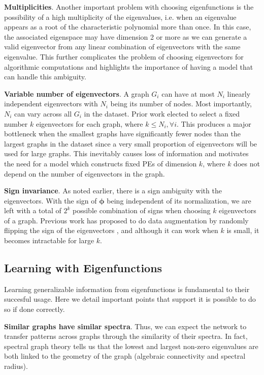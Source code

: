 \documentclass{article}
\newcommand{\xhdr}[1]{{\noindent\bfseries #1}.}
\def\eigvec{{\bm{\phi}}}
\begin{document}
\xhdr{Multiplicities}
Another important problem with choosing eigenfunctions is the possibility of a high multiplicity of the eigenvalues, i.e. when an eigenvalue appears as a root of the characteristic polynomial more than once. 
In this case, the associated eigenspace may have dimension 2 or more as we can generate a valid eigenvector from any linear combination of eigenvectors with the same eigenvalue. This further complicates the problem of choosing eigenvectors for algorithmic computations and highlights the importance of having a model that can handle this ambiguity.


\xhdr{Variable number of eigenvectors}
A graph $G_i$ can have at most $N_i$ linearly independent eigenvectors with $N_i$ being its number of nodes. Most importantly, $N_i$ can vary across all $G_i$ in the dataset. Prior work \cite{dwivedi2020generalization} elected to select a fixed number $k$ eigenvectors for each graph, where $k\leq N_i,  \forall i$. This produces a major bottleneck when the smallest graphs have significantly fewer nodes than the largest graphs in the dataset since a very small proportion of eigenvectors will be used for large graphs. This inevitably causes loss of information and motivates the need for a model which constructs fixed PEs of dimension $k$, where $k$ does not depend on the number of eigenvectors in the graph.



\xhdr{Sign invariance}
As noted earlier, there is a sign ambiguity with the eigenvectors. With the sign of $\eigvec$ being independent of its normalization, we are left with a total of $2^k$ possible combination of signs when choosing $k$ eigenvectors of a graph. Previous work has proposed to do data augmentation by randomly flipping the sign of the eigenvectors \cite{beaini_directional_2021, dwivedi2020benchmarking, dwivedi2020generalization}, and
although it can work when $k$ is small, it becomes intractable for large $k$.

\subsection{Learning with Eigenfunctions}

Learning generalizable information from eigenfunctions is fundamental to their succesful usage. Here we detail important points that support it is possible to do so if done correctly.

\xhdr{Similar graphs have similar spectra} Thus, we can expect the network to transfer patterns across graphs through the similarity of their spectra. In fact, spectral graph theory tells us that the lowest and largest non-zero eigenvalues are both linked to the geometry of the graph (algebraic connectivity and spectral radius).
\end{document}
